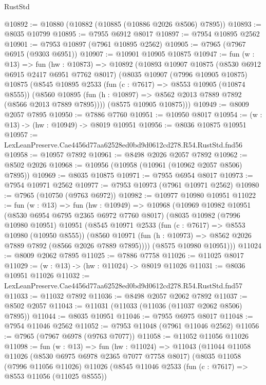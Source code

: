 \begin{lexlean}{RustStd}
\begin{coremodule}
@10892 := @10880 (@10882 (@10885 (@10886 @2026 @8506) @7895))
@10893 := @8035 @10799
@10895 := @7955 @6912 @8017
@10897 := @7954 @10895 @2562
@10901 := @7953 @10897 (@7961 @10895 @2562)
@10905 := @7965 (@7967 @6915 (@9303 @6951))
@10907 := @10901 @10905 @10875
@10947 := fun (w : @13) =>
  fun (hw : @10873) =>
  @10892
    (@10893
      @10907
      @10875
      (@8530 @6912 @6915 @2417 @6951 @7762 @8017)
      (@8035
        @10907
        (@7996 @10905 @10875)
        @10875
        (@8545
          @10895
          @2533
          (fun (c : @7617) => @8553 @10905 (@10874 @8555))
          (@8560 @10895 (fun (h : @10897) => @8562 @2013 @7889 @7892 (@8566 @2013 @7889 @7895))))
        (@8575 @10905 @10875)))
@10949 := @8009 @2057 @7895
@10950 := @7886 @7760
@10951 := @10950 @8017
@10954 := (w : @13) -> (hw : @10949) -> @8019 @10951
@10956 := @8036 @10875 @10951
@10957 := LexLeanPreserve.Cae4456d77aa62528ed0bd9d0612cd278.R54.RustStd.fnd56
@10958 := @10957 @7892
@10961 := @8498 @2026 @2057 @7892
@10962 := @8502 @2026
@10968 := @10956 (@10958 (@10961 (@10962 @2057 @8506) @7895))
@10969 := @8035 @10875
@10971 := @7955 @6954 @8017
@10973 := @7954 @10971 @2562
@10977 := @7953 @10973 (@7961 @10971 @2562)
@10980 := @7965 (@10750 (@9763 @6972))
@10982 := @10977 @10980 @10951
@11022 := fun (w : @13) =>
  fun (hw : @10949) =>
  @10968
    (@10969
      @10982
      @10951
      (@8530 @6954 @6795 @2365 @6972 @7760 @8017)
      (@8035
        @10982
        (@7996 @10980 @10951)
        @10951
        (@8545
          @10971
          @2533
          (fun (c : @7617) => @8553 @10980 (@10950 @8555))
          (@8560 @10971 (fun (h : @10973) => @8562 @2026 @7889 @7892 (@8566 @2026 @7889 @7895))))
        (@8575 @10980 @10951)))
@11024 := @8009 @2062 @7895
@11025 := @7886 @7758
@11026 := @11025 @8017
@11029 := (w : @13) -> (hw : @11024) -> @8019 @11026
@11031 := @8036 @10951 @11026
@11032 := LexLeanPreserve.Cae4456d77aa62528ed0bd9d0612cd278.R54.RustStd.fnd57
@11033 := @11032 @7892
@11036 := @8498 @2057 @2062 @7892
@11037 := @8502 @2057
@11043 := @11031 (@11033 (@11036 (@11037 @2062 @8506) @7895))
@11044 := @8035 @10951
@11046 := @7955 @6975 @8017
@11048 := @7954 @11046 @2562
@11052 := @7953 @11048 (@7961 @11046 @2562)
@11056 := @7965 (@7967 @6978 (@9763 @7077))
@11058 := @11052 @11056 @11026
@11098 := fun (w : @13) =>
  fun (hw : @11024) =>
  @11043
    (@11044
      @11058
      @11026
      (@8530 @6975 @6978 @2365 @7077 @7758 @8017)
      (@8035
        @11058
        (@7996 @11056 @11026)
        @11026
        (@8545
          @11046
          @2533
          (fun (c : @7617) => @8553 @11056 (@11025 @8555))

\end{coremodule}
\end{lexlean}
